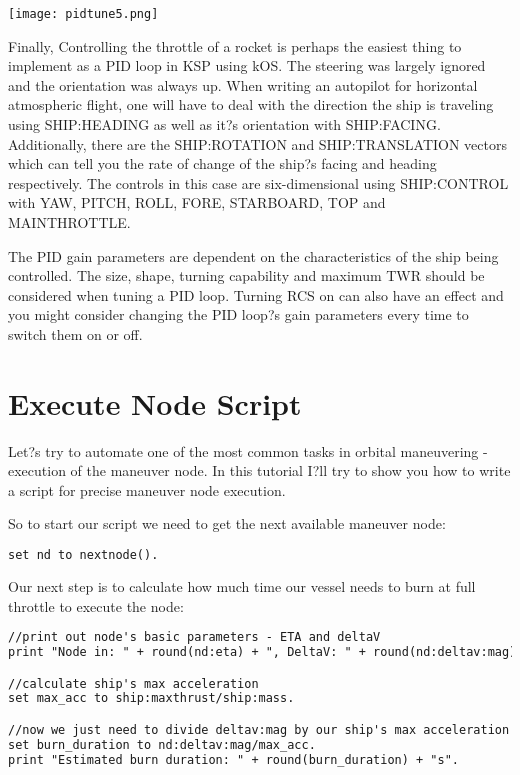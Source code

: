 \begin{center}
\texttt{[image: pidtune5.png]}
\end{center}

Finally, Controlling the throttle of a rocket is perhaps the easiest thing to implement as a PID loop in KSP using kOS. The steering was largely ignored and the orientation was always up. When writing an autopilot for horizontal atmospheric flight, one will have to deal with the direction the ship is traveling using SHIP:HEADING as well as it?s orientation with SHIP:FACING. Additionally, there are the SHIP:ROTATION and SHIP:TRANSLATION vectors which can tell you the rate of change of the ship?s facing and heading respectively. The controls in this case are six-dimensional using SHIP:CONTROL with YAW, PITCH, ROLL, FORE, STARBOARD, TOP and MAINTHROTTLE.

The PID gain parameters are dependent on the characteristics of the ship being controlled. The size, shape, turning capability and maximum TWR should be considered when tuning a PID loop. Turning RCS on can also have an effect and you might consider changing the PID loop?s gain parameters every time to switch them on or off.

	\section{Execute Node Script}%
Let?s try to automate one of the most common tasks in orbital maneuvering - execution of the maneuver node. In this tutorial I?ll try to show you how to write a script for precise maneuver node execution.

So to start our script we need to get the next available maneuver node:

\begin{lstlisting}[frame=single,language=XML]
set nd to nextnode().
\end{lstlisting} 

Our next step is to calculate how much time our vessel needs to burn at full throttle to execute the node:

\begin{lstlisting}[frame=single,language=XML]
//print out node's basic parameters - ETA and deltaV
print "Node in: " + round(nd:eta) + ", DeltaV: " + round(nd:deltav:mag).

//calculate ship's max acceleration
set max_acc to ship:maxthrust/ship:mass.

//now we just need to divide deltav:mag by our ship's max acceleration
set burn_duration to nd:deltav:mag/max_acc.
print "Estimated burn duration: " + round(burn_duration) + "s".
\end{lstlisting} 

